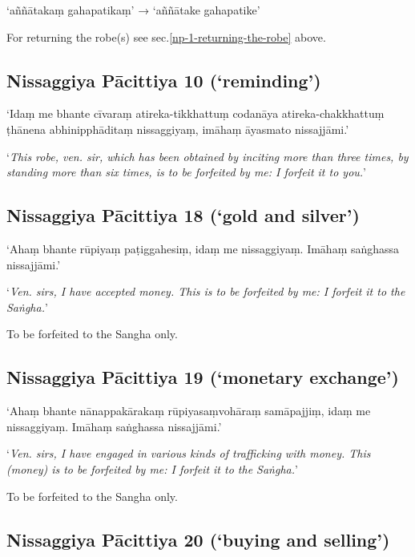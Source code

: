 ‘aññātakaṃ gahapatikaṃ’ → ‘aññātake gahapatike’

For returning the robe(s) see sec.\ref{np-1-returning-the-robe} above.


\subsection[NP 10 (‘reminding’)]{Nissaggiya Pācittiya 10 (‘reminding’)}

‘Idaṃ me bhante cīvaraṃ atireka-tikkhattuṃ codanāya atireka-chakkhattuṃ ṭhānena
abhinipphāditaṃ nissaggiyaṃ, imāhaṃ āyasmato nissajjāmi.’

‘\emph{This robe, ven. sir, which has been obtained by inciting more
  than three times, by standing more than six times, is to be forfeited by me: I
  forfeit it to you.}’ 


\subsection[NP 18 (‘gold and silver’)]{Nissaggiya Pācittiya 18 (‘gold and silver’)}

‘Ahaṃ bhante rūpiyaṃ paṭiggahesiṃ, idaṃ me nissaggiyaṃ. Imāhaṃ saṅghassa
nissajjāmi.’

‘\emph{Ven. sirs, I have accepted money. This is to be forfeited by me: I
  forfeit it to the Saṅgha.}’

To be forfeited to the Sangha only. 

\subsection[NP 19 (‘monetary exchange’)]{Nissaggiya Pācittiya 19 (‘monetary exchange’)}

‘Ahaṃ bhante nānappakārakaṃ rūpiyasaṃvohāraṃ samāpajjiṃ, idaṃ me nissaggiyaṃ.
Imāhaṃ saṅghassa nissajjāmi.’

‘\emph{Ven. sirs, I have engaged in various kinds of trafficking with money.
  This (money) is to be forfeited by me: I forfeit it to the Saṅgha.}’

To be forfeited to the Sangha only. 

\subsection[NP 20 (‘buying and selling’)]{Nissaggiya Pācittiya 20 (‘buying and selling’)}

